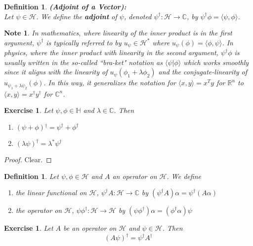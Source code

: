 \documentclass[12pt]{amsart}
\newtheorem{defn}[thm]{Definition}
\newtheorem{note}[thm]{Note}
\newtheorem{ex}[thm]{Exercise}
\renewcommand{\r}{\rangle}
\renewcommand{\l}{\langle}
\newcommand{\al}{\alpha}
\newcommand{\lam}{\lambda}
\newcommand{\C}{\mathbb{C}}
\renewcommand{\H}{\mathbb{H}}
\newcommand{\R}{\mathbb{R}}
\newcommand{\MH}{\mathcal{H}}
\newcommand{\da}{^{\dagger}}
\begin{document}
\begin{defn}\textbf{(Adjoint of a Vector):} \\
	Let $\psi \in \MH$. We define the \textbf{adjoint} of $\psi$, denoted $\psi^{\dagger}: \MH \rightarrow \C$, by $\psi^{\dagger} \phi = \l \psi, \phi\r$. 
\end{defn}

\begin{note}
	In mathematics, where linearity of the inner product is in the first argument, $\psi^{\dagger}$ is typically referred to by $u_{\psi} \in \MH^{*} $ where $u_{\psi}(\phi) = \l \phi, \psi\r$. In physics, where the inner product with linearity in the second argument, $\psi^{\dagger} \phi$ is usually written in the so-called ``bra-ket" notation as $\l \psi | \phi \r$ which works smoothly since it aligns with the linearity of $u_{\psi}(\phi_1 + \lam \phi_2)$ and the conjugate-linearity of $u_{\psi_1 + \lam \psi_2}(\phi)$. In this way, it generalizes the notation for $\l x, y\r = x^T y$ for $\R^n$ to $\l x, y\r = x\da y\da$ for $\C^n$. 
\end{note}

\begin{ex}
	Let $\psi, \phi \in \H$ and $ \lam \in \C$. Then 
	\begin{enumerate}
		\item $(\psi + \phi){\da} =  \psi\da + \phi\da$
		\item $(\lam \psi)\da = \lam^* \psi\da$
	\end{enumerate}
\end{ex}

\begin{proof}
	Clear.
\end{proof}

\begin{defn}
	Let $\psi, \phi \in \MH$ and $A$ an operator on $\MH$. We define 
	\begin{enumerate}
		\item the linear functional on $\MH$, $\psi \da A: \MH \rightarrow \C $ by $(\psi \da A) \al = \psi \da (A \al)$
		\item the operator on $\MH$, $\psi \phi \da : \MH \rightarrow \MH$ by $(\psi \phi \da) \al = (\phi\da \al) \psi$
	\end{enumerate}
\end{defn}

\begin{ex}
	Let $A$ be an operator on $\MH$ and $\psi \in \MH$. Then $$(A \psi)\da = \psi \da A\da $$
\end{ex}
\end{document}
